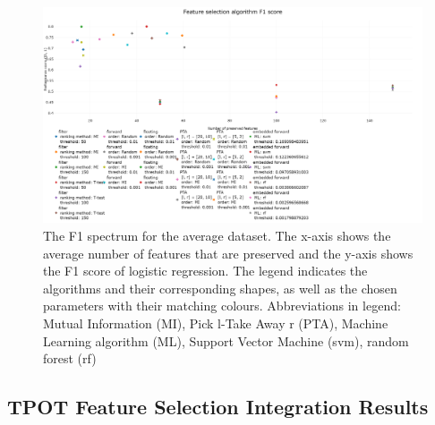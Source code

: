 \documentclass[10pt,a4paper]{report}
\begin{document}
	\begin{figure}[H]
		\centering
		\includegraphics[angle=90,height=1.4\textwidth]{F1_new.png}
		\caption{The F1 spectrum for the average dataset. The x-axis shows the average number of features that are preserved and the y-axis shows the F1 score of logistic regression. The legend indicates the algorithms and their corresponding shapes, as well as the chosen parameters with their matching colours. Abbreviations in legend: Mutual Information (MI), Pick l-Take Away r (PTA), Machine Learning algorithm (ML), Support Vector Machine (svm), random forest (rf)}
		\label{fig:Avg_F1_Spectrum}
	\end{figure}
	
	\subsection{TPOT Feature Selection Integration Results}
	
\end{document}
